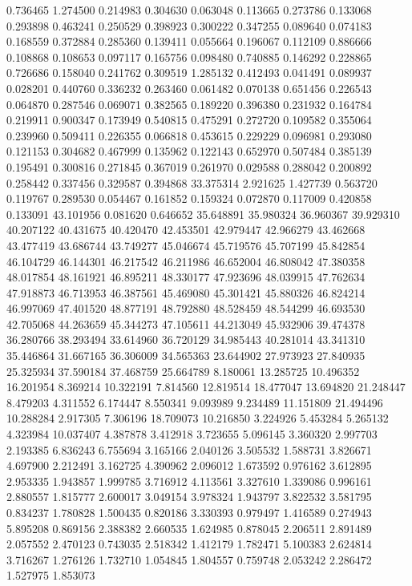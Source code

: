 0.736465
1.274500
0.214983
0.304630
0.063048
0.113665
0.273786
0.133068
0.293898
0.463241
0.250529
0.398923
0.300222
0.347255
0.089640
0.074183
0.168559
0.372884
0.285360
0.139411
0.055664
0.196067
0.112109
0.886666
0.108868
0.108653
0.097117
0.165756
0.098480
0.740885
0.146292
0.228865
0.726686
0.158040
0.241762
0.309519
1.285132
0.412493
0.041491
0.089937
0.028201
0.440760
0.336232
0.263460
0.061482
0.070138
0.651456
0.226543
0.064870
0.287546
0.069071
0.382565
0.189220
0.396380
0.231932
0.164784
0.219911
0.900347
0.173949
0.540815
0.475291
0.272720
0.109582
0.355064
0.239960
0.509411
0.226355
0.066818
0.453615
0.229229
0.096981
0.293080
0.121153
0.304682
0.467999
0.135962
0.122143
0.652970
0.507484
0.385139
0.195491
0.300816
0.271845
0.367019
0.261970
0.029588
0.288042
0.200892
0.258442
0.337456
0.329587
0.394868
33.375314
2.921625
1.427739
0.563720
0.119767
0.289530
0.054467
0.161852
0.159324
0.072870
0.117009
0.420858
0.133091
43.101956
0.081620
0.646652
35.648891
35.980324
36.960367
39.929310
40.207122
40.431675
40.420470
42.453501
42.979447
42.966279
43.462668
43.477419
43.686744
43.749277
45.046674
45.719576
45.707199
45.842854
46.104729
46.144301
46.217542
46.211986
46.652004
46.808042
47.380358
48.017854
48.161921
46.895211
48.330177
47.923696
48.039915
47.762634
47.918873
46.713953
46.387561
45.469080
45.301421
45.880326
46.824214
46.997069
47.401520
48.877191
48.792880
48.528459
48.544299
46.693530
42.705068
44.263659
45.344273
47.105611
44.213049
45.932906
39.474378
36.280766
38.293494
33.614960
36.720129
34.985443
40.281014
43.341310
35.446864
31.667165
36.306009
34.565363
23.644902
27.973923
27.840935
25.325934
37.590184
37.468759
25.664789
8.180061
13.285725
10.496352
16.201954
8.369214
10.322191
7.814560
12.819514
18.477047
13.694820
21.248447
8.479203
4.311552
6.174447
8.550341
9.093989
9.234489
11.151809
21.494496
10.288284
2.917305
7.306196
18.709073
10.216850
3.224926
5.453284
5.265132
4.323984
10.037407
4.387878
3.412918
3.723655
5.096145
3.360320
2.997703
2.193385
6.836243
6.755694
3.165166
2.040126
3.505532
1.588731
3.826671
4.697900
2.212491
3.162725
4.390962
2.096012
1.673592
0.976162
3.612895
2.953335
1.943857
1.999785
3.716912
4.113561
3.327610
1.339086
0.996161
2.880557
1.815777
2.600017
3.049154
3.978324
1.943797
3.822532
3.581795
0.834237
1.780828
1.500435
0.820186
3.330393
0.979497
1.416589
0.274943
5.895208
0.869156
2.388382
2.660535
1.624985
0.878045
2.206511
2.891489
2.057552
2.470123
0.743035
2.518342
1.412179
1.782471
5.100383
2.624814
3.716267
1.276126
1.732710
1.054845
1.804557
0.759748
2.053242
2.286472
1.527975
1.853073
